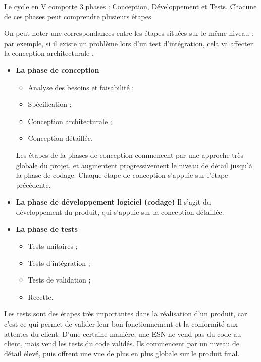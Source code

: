 Le cycle en V comporte 3 phases : Conception, Développement et Tests. Chacune de ces phases peut comprendre plusieurs étapes.

On peut noter une correspondances entre les étapes situées sur le même niveau : par exemple, si il existe un problème lors d'un test d'intégration, cela va affecter la conception architecturale . \\


\begin{itemize}
\item \textbf{La phase de conception}

\begin{itemize}
\item Analyse des besoins et faisabilité ;
\item Spécification ;
\item Conception architecturale ;
\item Conception détaillée.
\end{itemize}

Les étapes de la phases de conception commencent par une approche très globale du projet, et augmentent progressivement le niveau de détail jusqu'à la phase de codage. Chaque étape de conception s'appuie sur l'étape précédente. \\

\item \textbf{La phase de développement logiciel (codage)}
Il s'agit du développement du produit, qui s'appuie sur la conception détaillée. \\

\item \textbf{La phase de tests}

\begin{itemize}
\item Tests unitaires ;
\item Tests d'intégration ;
\item Tests de validation ;
\item Recette.
\end{itemize}

\end{itemize}

Les tests sont des étapes très importantes dans la réalisation d'un produit, car c'est ce qui permet de valider leur bon fonctionnement et la conformité aux attentes du client. D'une certaine manière, une ESN ne vend pas du code au client, mais vend les tests du code validés. Ils commencent par un niveau de détail élevé, puis offrent une vue de plus en plus globale sur le produit final.

